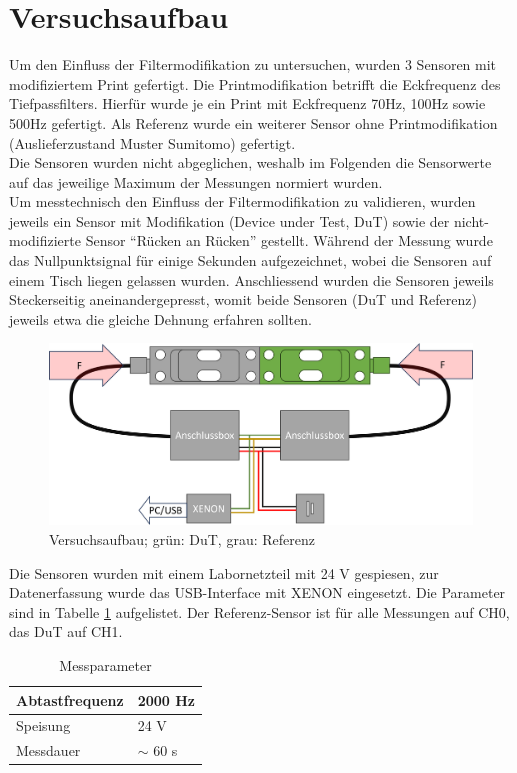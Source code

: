 
	\section{Versuchsaufbau}
Um den Einfluss der Filtermodifikation zu untersuchen, wurden 3 Sensoren mit modifiziertem Print gefertigt. Die Printmodifikation betrifft die Eckfrequenz des Tiefpassfilters. Hierfür wurde je ein Print mit Eckfrequenz 70Hz, 100Hz sowie 500Hz gefertigt. Als Referenz wurde ein weiterer Sensor ohne Printmodifikation (Auslieferzustand Muster Sumitomo) gefertigt.\\
Die Sensoren wurden nicht abgeglichen, weshalb im Folgenden die Sensorwerte auf das jeweilige Maximum der Messungen normiert wurden.\\
Um messtechnisch den Einfluss der Filtermodifikation zu validieren, wurden jeweils ein Sensor mit Modifikation (Device under Test, DuT) sowie der nicht-modifizierte Sensor  ``Rücken an Rücken'' gestellt. Während der Messung wurde das Nullpunktsignal für einige Sekunden aufgezeichnet, wobei die Sensoren auf einem Tisch liegen gelassen wurden. Anschliessend wurden die Sensoren jeweils Steckerseitig aneinandergepresst, womit beide Sensoren (DuT und Referenz) jeweils etwa die gleiche Dehnung erfahren sollten. 
	\begin{figure}[H]
		\centering
		\includegraphics[width=1\linewidth]{Aufbau}
		\caption{Versuchsaufbau; grün: DuT, grau: Referenz}
		\label{fig:screenshot001}
	\end{figure}
\noindent Die Sensoren wurden mit einem Labornetzteil mit 24 V gespiesen, zur Datenerfassung wurde das USB-Interface mit XENON eingesetzt. Die Parameter sind in Tabelle \ref{tab:params} aufgelistet. Der Referenz-Sensor ist für alle Messungen auf CH0, das DuT auf CH1.
	\begin{table}[H]
		\centering
		\caption{Messparameter}
	\begin{tabular}{l|l}
		Abtastfrequenz & 2000 Hz \\
		\hline
		Speisung & 24 V \\
		\hline
		Messdauer & $\sim$ 60 s \\
	\end{tabular}	
	\label{tab:params}
	\end{table}

